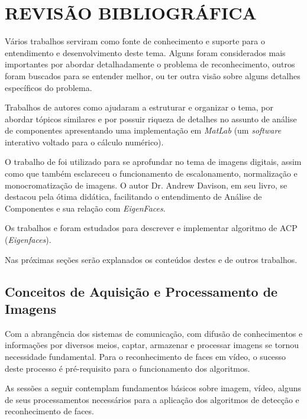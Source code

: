 
\chapter{REVISÃO BIBLIOGRÁFICA}\label{ch:rev-bibs}

Vários trabalhos serviram como fonte de conhecimento e suporte para o entendimento e desenvolvimento deste tema. Alguns foram considerados mais importantes por abordar detalhadamente o problema de reconhecimento, outros foram buscados para se entender melhor, ou ter outra visão sobre alguns detalhes específicos do problema.

Trabalhos de autores como  ajudaram a estruturar e organizar o tema, por abordar tópicos similares e por possuir riqueza de detalhes no assunto de análise de componentes apresentando uma implementação em \textit{MatLab} (um \textit{software} interativo voltado para o cálculo numérico).

O trabalho de  foi utilizado para se aprofundar no tema de imagens digitais, assim como   que também esclareceu o funcionamento de escalonamento, normalização e monocromatização de imagens. O autor Dr. Andrew Davison, em seu livro,  se destacou pela ótima didática, facilitando o entendimento de Análise de Componentes e sua relação com \textit{EigenFaces}. 

Os trabalhos  e  foram estudados para descrever e implementar algoritmo de ACP (\textit{Eigenfaces}).

Nas próximas seções serão explanados os conteúdos destes e de outros trabalhos.


\section{Conceitos de Aquisição e Processamento de Imagens}\label{sec:processamento_imagens}

Com a abrangência dos sistemas de comunicação, com difusão de conhecimentos e informações por diversos meios, captar, armazenar e processar imagens se tornou necessidade fundamental. Para o reconhecimento de faces em vídeo, o sucesso deste processo é pré-requisito  para o funcionamento dos algoritmos. 

As sessões a seguir contemplam fundamentos básicos sobre imagem, vídeo, alguns de seus processamentos necessários para a aplicação dos algoritmos de detecção e reconhecimento de faces.


